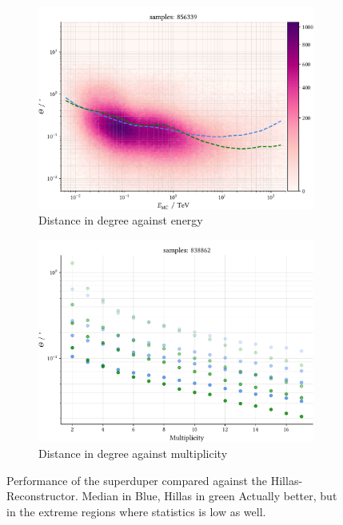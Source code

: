 \begin{figure}
    \centering
    \begin{subfigure}{0.9\textwidth}
        \includegraphics[width=\linewidth]{../analysis/plots/gamma_cut/pairwise_median_100_vs_energy.pdf} 
        \caption{Distance in degree against energy}
    \end{subfigure}
    \begin{subfigure}{0.9\textwidth}
        \includegraphics[width=\linewidth]{../analysis/plots/gamma_cut/pairwise_median_100_vs_multi_comp.pdf}
        \caption{Distance in degree against multiplicity}
    \end{subfigure}
    \caption{Performance of the superduper compared 
    against the Hillas-Reconstructor. Median in Blue, Hillas in green
    Actually better, but in the extreme regions where statistics is low as well.}
    \label{fig:stereo_double}
\end{figure}


